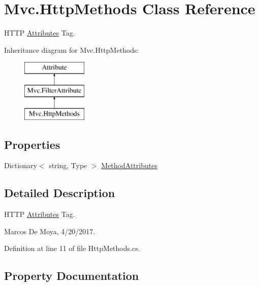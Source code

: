 \hypertarget{class_mvc_1_1_http_methods}{}\section{Mvc.\+Http\+Methods Class Reference}
\label{class_mvc_1_1_http_methods}


H\+T\+TP \hyperlink{namespace_mvc_1_1_attributes}{Attributes} Tag.  


Inheritance diagram for Mvc.\+Http\+Methods\+:\begin{figure}[H]
\begin{center}
\leavevmode
\includegraphics[height=3.000000cm]{class_mvc_1_1_http_methods}
\end{center}
\end{figure}
\subsection*{Properties}
\begin{DoxyCompactItemize}
\item 
Dictionary$<$ string, Type $>$ \hyperlink{class_mvc_1_1_http_methods_aacb9c8966ebf984d49d5f0dc5f40cf68}{Method\+Attributes}
\end{DoxyCompactItemize}


\subsection{Detailed Description}
H\+T\+TP \hyperlink{namespace_mvc_1_1_attributes}{Attributes} Tag. 

Marcos De Moya, 4/20/2017. 

Definition at line 11 of file Http\+Methods.\+cs.



\subsection{Property Documentation}
\mbox{\label{class_mvc_1_1_http_methods_aacb9c8966ebf984d49d5f0dc5f40cf68}} 
